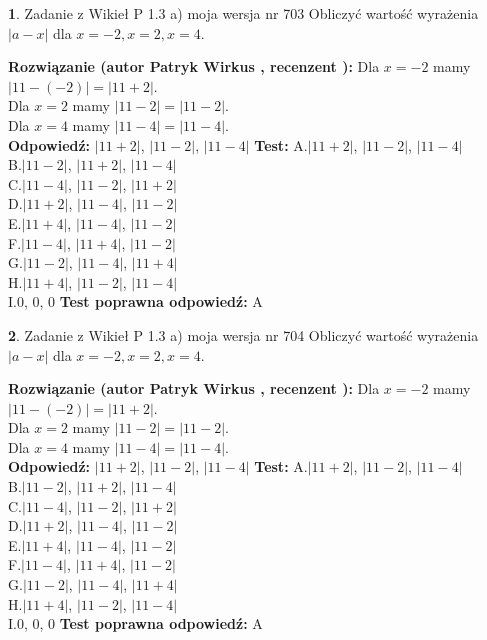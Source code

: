 \documentclass[12pt, a4paper]{article}
\theoremstyle{definition} %
\newtheorem{zad}{}
\newcommand{\zadStart}[1]{\begin{zad}#1\newline}
\newcommand{\zadStop}{\end{zad}}
\newcommand{\rozwStart}[2]{\noindent \textbf{Rozwiązanie (autor #1 , recenzent #2): }\newline}
\newcommand{\rozwStop}{\newline}
\newcommand{\odpStart}{\noindent \textbf{Odpowiedź:}\newline}
\newcommand{\odpStop}{\newline}
\newcommand{\testStart}{\noindent \textbf{Test:}\newline}
\newcommand{\testStop}{\newline}
\newcommand{\kluczStart}{\noindent \textbf{Test poprawna odpowiedź:}\newline}
\newcommand{\kluczStop}{\newline}
\begin{document}
\zadStart{Zadanie z Wikieł P 1.3 a) moja wersja nr 703}
Obliczyć wartość wyrażenia $|a - x|$ dla $x=-2,x=2,x=4$.
\zadStop
\rozwStart{Patryk Wirkus}{}
Dla $x = -2$ mamy $|11 - (-2)| = |11 + 2|$.\\
Dla $x = 2$ mamy $|11 - 2| = |11 - 2|$.\\
Dla $x = 4$ mamy $|11 - 4| = |11 - 4|$.\\
\rozwStop
\odpStart
$|11 + 2|$, $|11 - 2|$, $|11 - 4|$
\odpStop
\testStart
A.$|11 + 2|$, $|11 - 2|$, $|11 - 4|$\\
B.$|11 - 2|$, $|11 + 2|$, $|11 - 4|$\\
C.$|11 - 4|$, $|11 - 2|$, $|11 + 2|$\\
D.$|11 + 2|$, $|11 - 4|$, $|11 - 2|$\\
E.$|11 + 4|$, $|11 - 4|$, $|11 - 2|$\\
F.$|11 - 4|$, $|11 + 4|$, $|11 - 2|$\\
G.$|11 - 2|$, $|11 - 4|$, $|11 + 4|$\\
H.$|11 + 4|$, $|11 - 2|$, $|11 - 4|$\\
I.$0$, $0$, $0$
\testStop
\kluczStart
A
\kluczStop



\zadStart{Zadanie z Wikieł P 1.3 a) moja wersja nr 704}
Obliczyć wartość wyrażenia $|a - x|$ dla $x=-2,x=2,x=4$.
\zadStop
\rozwStart{Patryk Wirkus}{}
Dla $x = -2$ mamy $|11 - (-2)| = |11 + 2|$.\\
Dla $x = 2$ mamy $|11 - 2| = |11 - 2|$.\\
Dla $x = 4$ mamy $|11 - 4| = |11 - 4|$.\\
\rozwStop
\odpStart
$|11 + 2|$, $|11 - 2|$, $|11 - 4|$
\odpStop
\testStart
A.$|11 + 2|$, $|11 - 2|$, $|11 - 4|$\\
B.$|11 - 2|$, $|11 + 2|$, $|11 - 4|$\\
C.$|11 - 4|$, $|11 - 2|$, $|11 + 2|$\\
D.$|11 + 2|$, $|11 - 4|$, $|11 - 2|$\\
E.$|11 + 4|$, $|11 - 4|$, $|11 - 2|$\\
F.$|11 - 4|$, $|11 + 4|$, $|11 - 2|$\\
G.$|11 - 2|$, $|11 - 4|$, $|11 + 4|$\\
H.$|11 + 4|$, $|11 - 2|$, $|11 - 4|$\\
I.$0$, $0$, $0$
\testStop
\kluczStart
A
\kluczStop
\end{document}
